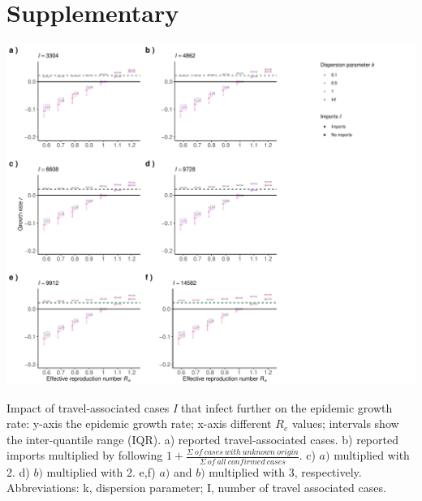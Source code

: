 \documentclass[10pt, a4paper, twoside]{article}
\begin{document}
\section{Supplementary}
\begin{suppfigure}[h]
\centering
\includegraphics[scale=0.5]{growth_r_imports_infect_2021-02-24.pdf}
\caption{Impact of travel-associated cases \emph{I} that infect further on the epidemic growth rate: y-axis the epidemic growth rate; x-axis different $R_e$ values; intervals show the inter-quantile range (IQR). a) reported travel-associated cases. b) reported imports multiplied by following $1+ \frac{\Sigma ~of ~cases ~with ~unknown ~origin }{\Sigma ~of ~all ~confirmed ~cases}$. c) $a)$ multiplied with 2. d) $b)$ multiplied with 2. e,f) $a)$ and $b)$ multiplied with 3, respectively. Abbreviations: k, dispersion parameter; I, number of travel associated cases.}
\end{suppfigure}
\clearpage
\end{document}
